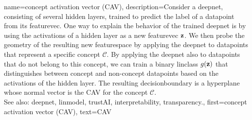 {name={concept activation vector (CAV)},
	description={Consider a \gls{deepnet}, consisting of 
		several hidden \glspl{layer}, trained to predict the \gls{label} of a 
		\gls{datapoint} from its \gls{featurevec}. One way to explain the behavior 
		of the trained \gls{deepnet} is by using the \glspl{activation} of a 
		hidden \gls{layer} as a new \gls{featurevec} ${\bf z}$. We then probe 
		the geometry of the resulting new \gls{featurespace} by applying the 
		\gls{deepnet} to \glspl{datapoint} that represent a specific concept 
		$\mathcal{C}$. By applying the \gls{deepnet} also to \glspl{datapoint} 
		that do not belong to this concept, we can train a binary \gls{linclass} 
		$g({\bf z})$ that distinguishes between concept and non-concept \glspl{datapoint} 
		based on the \glspl{activation} of the hidden \gls{layer}. The resulting 
		\gls{decisionboundary} is a \gls{hyperplane} whose normal \gls{vector} is 
		the CAV \cite{kim2018interpretability} for the concept $\mathcal{C}$. 
				\\
		 See also: \gls{deepnet}, \gls{linmodel}, \gls{trustAI}, \gls{interpretability}, \gls{transparency}.}, 
	first={concept activation vector (CAV)},
	text={CAV}
}

